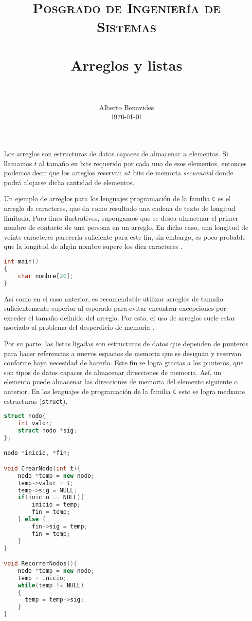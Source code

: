 \documentclass[paper=leter, fontsize=11pt]{scrartcl}
\title{
		\usefont{OT1}{bch}{b}{n}
		\normalfont \normalsize \textsc{Posgrado de Ingeniería de Sistemas} \\ [25pt]
		\horrule{0.5pt} \\[0.4cm]
		\huge Arreglos y listas \\
		\horrule{2pt} \\[0.5cm]
}
\author{
		\normalfont 								\normalsize
        Alberto Benavides\\[-3pt]		\normalsize
        \today
}
\date{}
\numberwithin{equation}{section}		%
\numberwithin{figure}{section}			%
\numberwithin{table}{section}				%
\begin{document}
\maketitle

Los arreglos son estructuras de datos capaces de almacenar $n$ elementos. Si llamamos $t$ al tamaño en bits requerido por cada uno de esos elementos, entonces podemos decir que los arreglos reservan $nt$ bits de memoria \textit{secuencial} donde podrá alojarse dicha cantidad de elementos. 

Un ejemplo de arreglos para los lenguajes programación de la familia \texttt{C} es el arreglo de caracteres, que da como resultado una cadena de texto de longitud limitada. Para fines ilustrativos, supongamos que se desea almacenar el primer nombre de contacto de una persona en un arreglo. En dicho caso, una longitud de veinte caracteres parecería suficiente para este fin, sin embargo, es poco probable que la longitud de algún nombre supere los diez caracteres \cite{nombres}. 

\begin{lstlisting}[language=C++, caption=Arreglo de veinte caracteres en \texttt{C}.]
int main()
{
	char nombre[20];
}
\end{lstlisting}

Así como en el caso anterior, es recomendable utilizar arreglos de tamaño suficientemente superior al esperado para evitar encontrar excepciones por exceder el tamaño definido del arreglo. Por esto, el uso de arreglos suele estar asociado al problema del desperdicio de memoria \cite{arreglos}.

Por su parte, las listas ligadas son estructuras de datos que dependen de punteros para hacer referencias a nuevos espacios de memoria que se designan y reservan conforme haya necesidad de hacerlo. Este fin se logra gracias a los punteros, que son tipos de datos capaces de almacenar direcciones de memoria. Así, un elemento puede almacenar las direcciones de memoria del elemento siguiente o anterior. En los lenguajes de programación de la familia \texttt{C} esto se logra mediante estructuras (\texttt{struct}).

\begin{lstlisting}[language=C++, caption=Funciones para creación y recorrido de listas.]
struct nodo{
	int valor;
	struct nodo *sig;  
};

nodo *inicio, *fin;

void CrearNodo(int t){
    nodo *temp = new nodo;
    temp->valor = t;
    temp->sig = NULL;
    if(inicio == NULL){
        inicio = temp;
        fin = temp;
    } else {
        fin->sig = temp;
        fin = temp;
    }
}

void RecorrerNodos(){
    nodo *temp = new nodo;
    temp = inicio;
    while(temp != NULL)
    {
      temp = temp->sig;
    }
}
\end{lstlisting}
\end{document}
